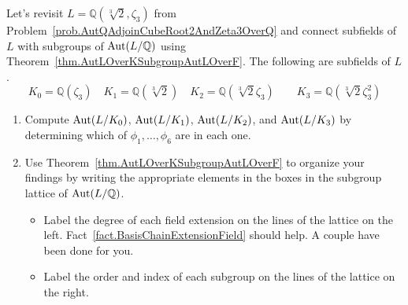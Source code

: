 \begin{problem}\label{prob.AutQAdjoinCubeRoot2AndZeta3OverQLattices}
Let's revisit $L = \mathbb{Q}(\sqrt[3]{2},\zeta_3)$ from Problem~\ref{prob.AutQAdjoinCubeRoot2AndZeta3OverQ} and connect subfields of $L$ with subgroups of $\operatorname{Aut}(L/\mathbb{Q})$ using Theorem~\ref{thm.AutLOverKSubgroupAutLOverF}. The following are subfields of $L$.
\[K_0 = \mathbb{Q}(\zeta_3)\quad K_1 = \mathbb{Q}(\sqrt[3]{2})\quad K_2 = \mathbb{Q}(\sqrt[3]{2}\zeta_3)\quad \quad K_3 = \mathbb{Q}(\sqrt[3]{2}\zeta_3^2)\]
\begin{enumerate}
\item Compute $\operatorname{Aut}(L/K_0)$, $\operatorname{Aut}(L/K_1)$, $\operatorname{Aut}(L/K_2)$, and $\operatorname{Aut}(L/K_3)$ by determining which of  $\phi_1,\ldots,\phi_6$ are in each one.
\item Use Theorem~\ref{thm.AutLOverKSubgroupAutLOverF} to organize your findings by writing the appropriate elements in the boxes in the subgroup lattice of $\operatorname{Aut}(L/\mathbb{Q})$. 
\begin{itemize}
\item Label the degree of each field extension on the lines of the lattice on the left. Fact~\ref{fact.BasisChainExtensionField} should help. A couple have been done for you.
\item Label the order and index of each subgroup on the lines of the lattice on the right.   
\end{itemize} 
\end{enumerate}
\begin{center}
\end{center}
\end{problem}

